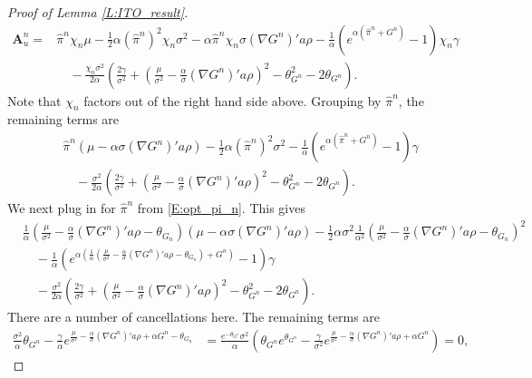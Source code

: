 \documentclass[11pt, letterpaper]{amsart}
\theoremstyle{definition}
\theoremstyle{remark}
\numberwithin{equation}{section}
\newcommand{\hpi}{\hat{\pi}}
\begin{document}
\begin{proof}[Proof of Lemma \ref{L:ITO_result}]
\begin{equation*}
\begin{split}
\mathbf{A}^n_u =&\hpi^n\chi_n\mu - \frac{1}{2}\alpha (\hpi^n)^2\chi_n\sigma^2  - \alpha \hpi^n\chi_n\sigma(\nabla G^n)'a\rho - \frac{1}{\alpha}\left(e^{\alpha\left(\hpi^n + G^n\right)}-1\right)\chi_n\gamma\\
&\quad - \frac{\chi_n\sigma^2}{2\alpha}\left(\frac{2\gamma}{\sigma^2} + \left(\frac{\mu}{\sigma^2} - \frac{\alpha}{\sigma}(\nabla G^n)'a\rho\right)^2 - \theta_{G^n}^2 - 2\theta_{G^n}\right).
\end{split}
\end{equation*}
Note that $\chi_n$ factors out of the right hand side above.  Grouping by $\hpi^n$, the remaining terms are
\begin{equation*}
\begin{split}
&\hpi^n\left(\mu - \alpha\sigma(\nabla G^n)'a\rho\right) - \frac{1}{2}\alpha (\hpi^n)^2\sigma^2   - \frac{1}{\alpha}\left(e^{\alpha\left(\hpi^n + G^n\right)}-1\right)\gamma\\
&\quad - \frac{\sigma^2}{2\alpha}\left(\frac{2\gamma}{\sigma^2} + \left(\frac{\mu}{\sigma^2} - \frac{\alpha}{\sigma}(\nabla G^n)'a\rho\right)^2 - \theta_{G^n}^2 - 2\theta_{G^n}\right).
\end{split}
\end{equation*}
We next plug in for $\hpi^n$ from \eqref{E:opt_pi_n}. This gives
\begin{equation*}
\begin{split}
&\frac{1}{\alpha}\left(\frac{\mu}{\sigma^2} - \frac{\alpha}{\sigma}(\nabla G^n)'a\rho - \theta_{G_n}\right)\left(\mu - \alpha\sigma(\nabla G^n)'a\rho\right) - \frac{1}{2}\alpha\sigma^2 \frac{1}{\alpha^2}\left(\frac{\mu}{\sigma^2} - \frac{\alpha}{\sigma}(\nabla G^n)'a\rho - \theta_{G_n}\right)^2\\
&\quad   - \frac{1}{\alpha}\left(e^{\alpha\left(\frac{1}{\alpha}\left(\frac{\mu}{\sigma^2} -\frac{\alpha}{\sigma}(\nabla G^n)'a\rho - \theta_{G_n}\right) + G^n\right)}-1\right)\gamma\\
&\quad - \frac{\sigma^2}{2\alpha}\left(\frac{2\gamma}{\sigma^2} + \left(\frac{\mu}{\sigma^2} - \frac{\alpha}{\sigma}(\nabla G^n)'a\rho\right)^2 - \theta_{G^n}^2 - 2\theta_{G^n}\right).
\end{split}
\end{equation*}
There are a number of cancellations here.  The remaining terms are
\begin{equation*}
\begin{split}
\frac{\sigma^2}{\alpha}\theta_{G^n} - \frac{\gamma}{\alpha}e^{\frac{\mu}{\sigma^2} - \frac{\alpha}{\sigma}(\nabla G^n)'a\rho + \alpha G^n - \theta_{G_n}}& = \frac{e^{-\theta_{G^n}}\sigma^2}{\alpha}\left(\theta_{G^n}e^{\theta_{G^n}} - \frac{\gamma}{\sigma^2} e^{\frac{\mu}{\sigma^2} - \frac{\alpha}{\sigma}(\nabla G^n)'a\rho + \alpha G^n}\right) = 0,

\end{split}
\end{equation*}
\end{proof}
\end{document}
